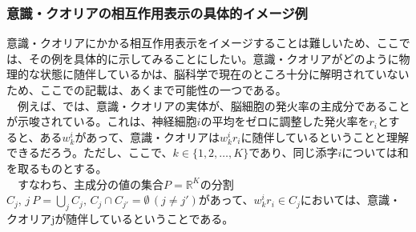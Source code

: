 \subsubsection{意識・クオリアの相互作用表示の具体的イメージ例}
意識・クオリアにかかる相互作用表示をイメージすることは難しいため、ここでは、その例を具体的に示してみることにしたい。意識・クオリアがどのように物理的な状態に随伴しているかは、脳科学で現在のところ十分に解明されていないため、ここでの記載は、あくまで可能性の一つである。\\
　例えば、\cite{Murray_2016}では、意識・クオリアの実体が、脳細胞の発火率の主成分であることが示唆されている。これは、神経細胞$i$の平均をゼロに調整した発火率を$r_i$とすると、ある$w_k^i$があって、意識・クオリアは$w_k^ir_i$に随伴しているということと理解できるだろう。ただし、ここで、$k\in\{1,2,\ldots,K\}$であり、同じ添字$i$については和を取るものとする。\\
　すなわち、主成分の値の集合$P=\mathbb{R}^K$の分割$C_j,\,j\ P=\bigcup_j C_j,\, C_j \cap C_{j'}=\emptyset \, (j \neq j')$があって、$w_k^ir_i \in C_j$においては、意識・クオリアjが随伴しているということである。
　